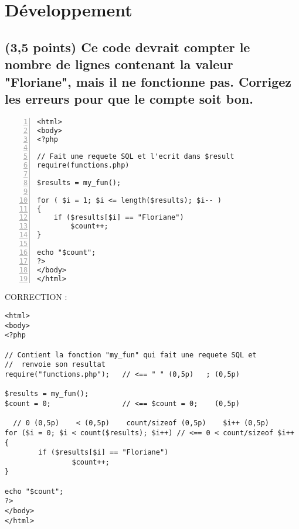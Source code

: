 \documentclass[11pt,a4paper]{article}
\begin{document}
\renewcommand\arraystretch{1}

\bigskip

\section{Développement}

\subsection{(3,5 points) Ce code devrait compter le nombre de lignes contenant la valeur "Floriane", mais il ne fonctionne pas. Corrigez les erreurs pour que le compte soit bon.}


\lstset{language=php}
\begin{lstlisting}[frame=single,numbers=left]
<html>
<body>
<?php

// Fait une requete SQL et l'ecrit dans $result
require(functions.php)

$results = my_fun();

for ( $i = 1; $i <= length($results); $i-- )
{
	if ($results[$i] == "Floriane")
		$count++;
}

echo "$count";
?>
</body>
</html>
\end{lstlisting}


CORRECTION :

\medskip

\lstset{language=php}
\begin{lstlisting}[frame=single]
<html>
<body>
<?php

// Contient la fonction "my_fun" qui fait une requete SQL et
//  renvoie son resultat
require("functions.php");	// <== " " (0,5p)   ; (0,5p)   

$results = my_fun();
$count = 0;					// <== $count = 0;    (0,5p)

  // 0 (0,5p)    < (0,5p)    count/sizeof (0,5p)    $i++ (0,5p)
for ($i = 0; $i < count($results); $i++) // <== 0 < count/sizeof $i++
{
        if ($results[$i] == "Floriane")
                $count++;
}

echo "$count";
?>
</body>
</html>
\end{lstlisting}

\bigskip
\end{document}
